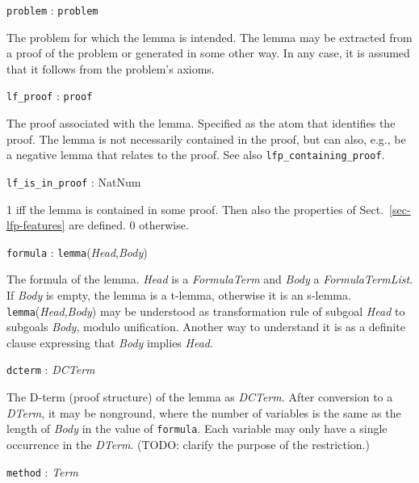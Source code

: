 \documentclass[a4paper,11pt]{article}
\newcommand{\f}[1]{\texttt{#1}}
\newcommand{\var}[1]{\textnormal{\textit{#1}}}
\newcommand{\lit}[1]{\textnormal{\textit{#1}}}
\newcommand{\propsig}[2]
{\noindent \f{#1} : #2}
\newcommand{\propdesc}[1]
{\par \hspace*{\fill}\begin{minipage}{0.9\textwidth}#1\end{minipage}\par\smallskip}
\begin{document}
\propsig{problem}{\f{problem}}

\propdesc{The problem for which the lemma is intended. The lemma may be
  extracted from a proof of the problem or generated in some other way. In any
  case, it is assumed that it follows from the problem's axioms.}

\propsig{lf\_proof}{\f{proof}}

\propdesc{The proof associated with the lemma. Specified as the atom that
  identifies the proof. The lemma is not necessarily contained in the proof,
  but can also, e.g., be a negative lemma that relates to the proof. See also
  \f{lfp\_containing\_proof}.}

\propsig{lf\_is\_in\_proof}{NatNum}

\propdesc{1 iff the lemma is contained in some proof. Then also the properties of
  Sect.~\ref{sec-lfp-features} are defined. 0 otherwise.}
  
\propsig{formula}{\f{lemma}(\var{Head},\var{Body})}

\propdesc{The formula of the lemma. \var{Head} is a \lit{FormulaTerm} and
  \var{Body} a \lit{FormulaTermList}. If \var{Body} is empty, the lemma is a
  t-lemma, otherwise it is an s-lemma. \f{lemma}(\var{Head},\var{Body}) may be
  understood as transformation rule of subgoal \var{Head} to subgoals
  \var{Body}, modulo unification. Another way to understand it is as a
  definite clause expressing that \var{Body} implies \var{Head}.}

\propsig{dcterm}{\lit{DCTerm}}

\propdesc{The D-term (proof structure) of the lemma as \lit{DCTerm}. After
  conversion to a \lit{DTerm}, it may be nonground, where the number of
  variables is the same as the length of \var{Body} in the value of
  \f{formula}. Each variable may only have a single occurrence in the
  \lit{DTerm}. (TODO: clarify the purpose of the restriction.)}

\propsig{method}{\lit{Term}}
\end{document}
